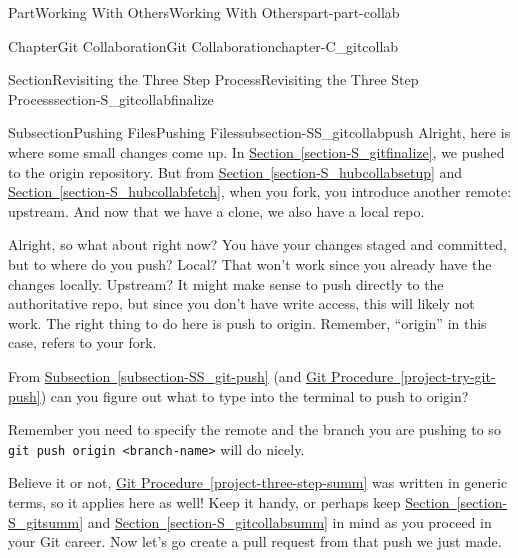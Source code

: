 \documentclass[oneside,10pt,]{book}
\newcommand{\xreffont}{\relax}
\newcommand{\mono}[1]{\texttt{#1}}
\begin{document}
\begin{partptx}{Part}{Working With Others}{}{Working With Others}{}{}{part-part-collab}
\begin{chapterptx}{Chapter}{Git Collaboration}{}{Git Collaboration}{}{}{chapter-C_gitcollab}
\begin{sectionptx}{Section}{Revisiting the Three Step Process}{}{Revisiting the Three Step Process}{}{}{section-S_gitcollabfinalize}
%
%
\typeout{************************************************}
\typeout{************************************************}
%
\begin{subsectionptx}{Subsection}{Pushing Files}{}{Pushing Files}{}{}{subsection-SS_gitcollabpush}
%
%
Alright, here is where some small changes come up. In \hyperref[section-S_gitfinalize]{Section~{\xreffont\ref{section-S_gitfinalize}}}, we pushed to the origin repository. But from \hyperref[section-S_hubcollabsetup]{Section~{\xreffont\ref{section-S_hubcollabsetup}}} and \hyperref[section-S_hubcollabfetch]{Section~{\xreffont\ref{section-S_hubcollabfetch}}}, when you fork, you introduce another remote: upstream. And now that we have a clone, we also have a local repo.%
\par
Alright, so what about right now? You have your changes staged and committed, but to where do you push? Local? That won't work since you already have the changes locally. Upstream? It might make sense to push directly to the authoritative repo, but since you don't have write access, this will likely not work. The right thing to do here is push to origin. Remember, ``origin'' in this case, refers to your fork.%
\par
From \hyperref[subsection-SS_git-push]{Subsection~{\xreffont\ref{subsection-SS_git-push}}} (and \hyperref[project-try-git-push]{Git Procedure~{\xreffont\ref{project-try-git-push}}}) can you figure out what to type into the terminal to push to origin?%
\par
Remember you need to specify the remote and the branch you are pushing to so \mono{git push origin <branch-name>} will do nicely.%
\end{subsectionptx}
\begin{conclusion}{}%
Believe it or not, \hyperref[project-three-step-summ]{Git Procedure~{\xreffont\ref{project-three-step-summ}}} was written in generic terms, so it applies here as well! Keep it handy, or perhaps keep \hyperref[section-S_gitsumm]{Section~{\xreffont\ref{section-S_gitsumm}}} and \hyperref[section-S_gitcollabsumm]{Section~{\xreffont\ref{section-S_gitcollabsumm}}} in mind as you proceed in your Git career. Now let's go create a pull request from that push we just made.%
\end{conclusion}%
\end{sectionptx}
%
%
\typeout{************************************************}
\typeout{************************************************}

\end{chapterptx}
\end{partptx}
\end{document}
